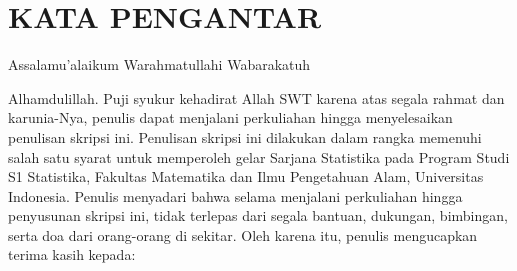 \chapter*{\normalsize KATA PENGANTAR}

\noindent Assalamu'alaikum Warahmatullahi Wabarakatuh

Alhamdulillah. Puji syukur kehadirat Allah SWT karena atas segala rahmat dan karunia-Nya, penulis dapat menjalani perkuliahan hingga menyelesaikan penulisan skripsi ini. Penulisan skripsi ini dilakukan dalam rangka memenuhi salah satu syarat untuk memperoleh gelar Sarjana Statistika pada Program Studi S1 Statistika, Fakultas Matematika dan Ilmu Pengetahuan Alam, Universitas Indonesia. Penulis menyadari bahwa selama menjalani perkuliahan hingga penyusunan skripsi ini, tidak terlepas dari segala bantuan, dukungan, bimbingan, serta doa dari orang-orang di sekitar. Oleh karena itu, penulis mengucapkan terima kasih kepada:
\vspace*{-0.2cm}
